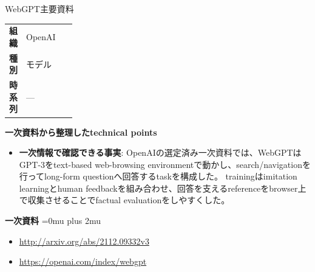 \begin{technicalnote}{WebGPT}{主要資料}
\begingroup
\begin{tabularx}{\linewidth}{@{}>{\bfseries}p{0.22\linewidth}X@{}}
組織 & OpenAI \\
種別 & モデル \\
時系列 & — \\
\end{tabularx}
\smallskip
{\bfseries 一次資料から整理したtechnical points}
\begin{itemize}[leftmargin=1.5em,itemsep=0.35em]
\item \textbf{一次情報で確認できる事実}: OpenAIの選定済み一次資料では、WebGPTはGPT-3をtext-based web-browsing environmentで動かし、search/navigationを行ってlong-form questionへ回答するtaskを構成した。 trainingはimitation learningとhuman feedbackを組み合わせ、回答を支えるreferenceをbrowser上で収集させることでfactual evaluationをしやすくした。
\end{itemize}
\begin{minipage}{\linewidth}
\begin{samepage}
{\bfseries 一次資料}
\begingroup\sloppy
\Urlmuskip=0mu plus 2mu\relax
\begin{itemize}[leftmargin=1.5em,itemsep=0.25em]
\item {\scriptsize\url{http://arxiv.org/abs/2112.09332v3}}
\item {\scriptsize\url{https://openai.com/index/webgpt}}
\end{itemize}
\endgroup
\end{samepage}
\end{minipage}
\endgroup
\end{technicalnote}
\medskip
